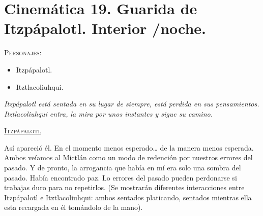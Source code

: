 \section{Cinemática 19. Guarida de Itzpápalotl. Interior /noche.} \label{Cin:Cinematica19}
\textsc{Personajes}:
\begin{itemize}
\item Itzpápalotl.
\item Itztlacoliuhqui. 
\end{itemize}
\textit{Itzpápalotl está sentada en su lugar de siempre, está perdida en sus pensamientos. Itztlacoliuhqui entra, la mira por unos instantes y sigue su camino.}
\begin{center}
\textsc{\underline{Itzpápalotl}}
\\
\par
Así apareció él. En el momento menos esperado… de la manera menos esperada. Ambos veíamos al Mictlán como un modo de redención por nuestros errores del pasado. Y de pronto, la arrogancia que había en mí era solo una sombra del pasado. Había encontrado paz. Lo errores del pasado pueden perdonarse si trabajas duro para no repetirlos. (Se mostrarán diferentes interacciones entre Itzpápalotl e Itztlacoliuhqui: ambos sentados platicando, sentados mientras ella esta recargada en él tomándolo de la mano).
\end{center}